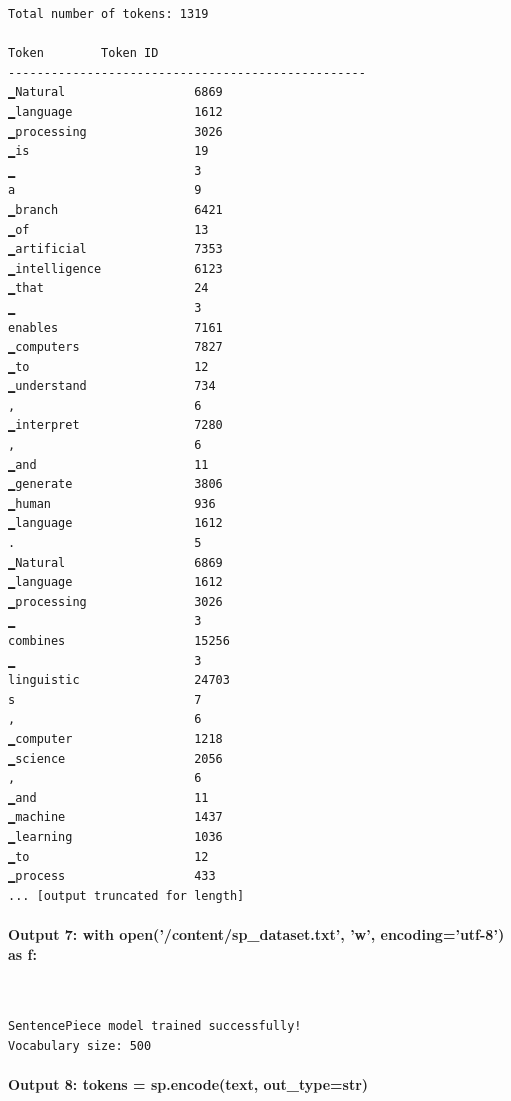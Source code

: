 \documentclass[12pt,a4paper,oneside]{report}
\begin{document}
\begin{Verbatim}[commandchars=\\\{\},breaklines=true,breakanywhere=true,fontsize=\scriptsize,frame=leftline,framesep=2mm,rulecolor=\color{gray}]
Total number of tokens: 1319

Token        Token ID
--------------------------------------------------
▁Natural                  6869
▁language                 1612
▁processing               3026
▁is                       19
▁                         3
a                         9
▁branch                   6421
▁of                       13
▁artificial               7353
▁intelligence             6123
▁that                     24
▁                         3
enables                   7161
▁computers                7827
▁to                       12
▁understand               734
,                         6
▁interpret                7280
,                         6
▁and                      11
▁generate                 3806
▁human                    936
▁language                 1612
.                         5
▁Natural                  6869
▁language                 1612
▁processing               3026
▁                         3
combines                  15256
▁                         3
linguistic                24703
s                         7
,                         6
▁computer                 1218
▁science                  2056
,                         6
▁and                      11
▁machine                  1437
▁learning                 1036
▁to                       12
▁process                  433
... [output truncated for length]
\end{Verbatim}
\paragraph{Output 7: with open('/content/sp\_dataset.txt', 'w', encoding='utf-8') as f:}\mbox{}\\[-1ex]
\begin{Verbatim}[commandchars=\\\{\},breaklines=true,breakanywhere=true,fontsize=\scriptsize,frame=leftline,framesep=2mm,rulecolor=\color{gray}]
SentencePiece model trained successfully!
Vocabulary size: 500
\end{Verbatim}
\paragraph{Output 8: tokens = sp.encode(text, out\_type=str)}\mbox{}\\[-1ex]
\end{document}
